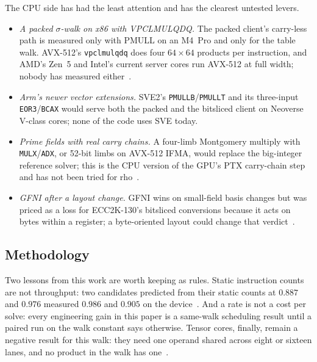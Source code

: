 The CPU side has had the least attention and has the clearest
untested levers.
\begin{itemize}[leftmargin=1.2em,itemsep=0.2em]
\item \emph{A packed $\sigma$-walk on x86 with VPCLMULQDQ.} The packed
  client's carry-less path is measured only with PMULL on an M4~Pro and
  only for the table walk. AVX-512's \texttt{vpclmulqdq} does four
  $64\times64$ products per instruction, and AMD's Zen~5 and Intel's
  current server cores run AVX-512 at full width; nobody has measured
  either~.
\item \emph{Arm's newer vector extensions.} SVE2's \texttt{PMULLB}/\texttt{PMULLT}
  and its three-input \texttt{EOR3}/\texttt{BCAX} would serve both the
  packed and the bitsliced client on Neoverse V-class cores; none of
  the code uses SVE today.
\item \emph{Prime fields with real carry chains.} A four-limb Montgomery
  multiply with \texttt{MULX}/\texttt{ADX}, or 52-bit limbs on AVX-512
  IFMA, would replace the big-integer reference solver; this is the CPU
  version of the GPU's PTX carry-chain step and has not been tried for
  rho~.
\item \emph{GFNI after a layout change.} GFNI wins on small-field basis
  changes but was priced as a loss for ECC2K-130's bitsliced conversions
  because it acts on bytes within a register; a byte-oriented layout
  could change that verdict~.
\end{itemize}

\subsection{Methodology}
\label{sec:open-method}

Two lessons from this work are worth keeping as rules. Static
instruction counts are not throughput: two candidates predicted from
their static counts at $0.887$ and $0.976$ measured $0.986$ and $0.905$ on
the device~.
And a rate is not a cost per solve: every engineering gain in this
paper is a same-walk scheduling result until a paired run on the walk
constant says otherwise. Tensor cores, finally, remain a negative
result for this walk: they need one operand shared across eight or
sixteen lanes, and no product in the walk has
one~.
